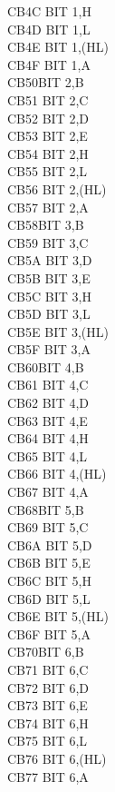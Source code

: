 \documentclass[twoside,openright,a4paper]{book}
\begin{document}
\begin{multicols}{3}
{\begin{tabbing}
	CB4C\> 	BIT 1,H\\
	CB4D\> 	BIT 1,L\\
	CB4E\> 	BIT 1,(HL)\\
	CB4F\> 	BIT 1,A\\
	CB50\>BIT 2,B\\
	CB51\> 	BIT 2,C\\
	CB52\> 	BIT 2,D\\
	CB53\> 	BIT 2,E\\
	CB54\> 	BIT 2,H\\
	CB55\> 	BIT 2,L\\
	CB56\> 	BIT 2,(HL)\\
	CB57\> 	BIT 2,A\\
	CB58\>BIT 3,B\\
	CB59\> 	BIT 3,C\\
	CB5A\> 	BIT 3,D\\
	CB5B\> 	BIT 3,E\\
	CB5C\> 	BIT 3,H\\
	CB5D\> 	BIT 3,L\\
	CB5E\> 	BIT 3,(HL)\\
	CB5F\> 	BIT 3,A\\
	CB60\>BIT 4,B\\
	CB61\> 	BIT 4,C\\
	CB62\> 	BIT 4,D\\
	CB63\> 	BIT 4,E\\
	CB64\> 	BIT 4,H\\
	CB65\> 	BIT 4,L\\
	CB66\> 	BIT 4,(HL)\\
	CB67\> 	BIT 4,A\\
	CB68\>BIT 5,B\\
	CB69\> 	BIT 5,C\\
	CB6A\> 	BIT 5,D\\
	CB6B\> 	BIT 5,E\\
	CB6C\> 	BIT 5,H\\
	CB6D\> 	BIT 5,L\\
	CB6E\> 	BIT 5,(HL)\\
	CB6F\> 	BIT 5,A\\
	CB70\>BIT 6,B\\
	CB71\> 	BIT 6,C\\
	CB72\> 	BIT 6,D\\
	CB73\> 	BIT 6,E\\
	CB74\> 	BIT 6,H\\
	CB75\> 	BIT 6,L\\
	CB76\> 	BIT 6,(HL)\\
	CB77\> 	BIT 6,A\\

\end{tabbing}}
\end{multicols}
\end{document}
